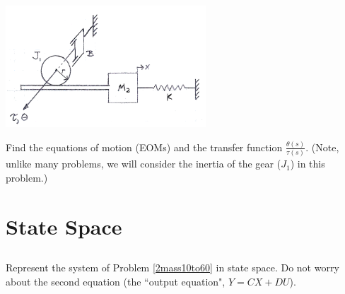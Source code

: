 \documentclass{article}	%
\begin{document}


\subsection{}

\includegraphics[width=75mm]{00960aa.png}

Find the equations of motion (EOMs)  and the transfer function  $\frac{\theta(s)}{\tau(s)}$. (Note, unlike many problems, we will consider the inertia of the gear ($J_1$) in this problem.)

%





\section*{State Space}

\subsection{}\label{ICPss_1mass}
\subsubsection{}
Represent the system of Problem \ref{2mass10to60} in state space. Do not worry about the second
equation (the ``output equation", $Y = CX+DU$).
\end{document}
